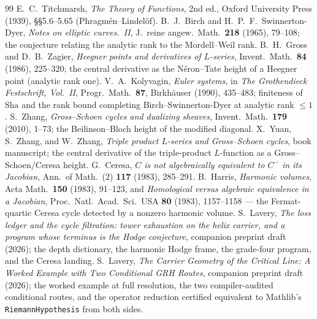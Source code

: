 \documentclass[11pt]{article}
\theoremstyle{definition}
\newcommand{\Sha}{\mathrm{Sha}}
\begin{document}
\begin{thebibliography}{99}
 E.~C.~Titchmarsh, \emph{The Theory of Functions}, 2nd ed., Oxford University
Press (1939), \S\S5.6--5.65 (Phragm\'en--Lindel\"of).
 B.~J.~Birch and H.~P.~F.~Swinnerton-Dyer, \emph{Notes on elliptic curves.\ II},
J.\ reine angew.\ Math.\ \textbf{218} (1965), 79--108; the conjecture relating the analytic rank to
the Mordell--Weil rank.
 B.~H.~Gross and D.~B.~Zagier, \emph{Heegner points and derivatives of
$L$-series}, Invent.\ Math.\ \textbf{84} (1986), 225--320; the central derivative as the
N\'eron--Tate height of a Heegner point (analytic rank one).
 V.~A.~Kolyvagin, \emph{Euler systems}, in \emph{The Grothendieck Festschrift,
Vol.\ II}, Progr.\ Math.\ \textbf{87}, Birkh\"auser (1990), 435--483; finiteness of $\Sha$ and the
rank bound completing Birch--Swinnerton-Dyer at analytic rank $\le1$.
 S.~Zhang, \emph{Gross--Schoen cycles and dualizing sheaves}, Invent.\ Math.\
\textbf{179} (2010), 1--73; the Beilinson--Bloch height of the modified diagonal.
\bibitem{YZZ} X.~Yuan, S.~Zhang, and W.~Zhang, \emph{Triple product $L$-series and Gross--Schoen
cycles}, book manuscript; the central derivative of the triple-product $L$-function as a
Gross--Schoen/Ceresa height.
 G.~Ceresa, \emph{$C$ is not algebraically equivalent to $C^-$ in its Jacobian},
Ann.\ of Math.\ (2) \textbf{117} (1983), 285--291.
 B.~Harris, \emph{Harmonic volumes}, Acta Math.\ \textbf{150} (1983), 91--123, and
\emph{Homological versus algebraic equivalence in a Jacobian}, Proc.\ Natl.\ Acad.\ Sci.\ USA
\textbf{80} (1983), 1157--1158 --- the Fermat-quartic Ceresa cycle detected by a nonzero harmonic volume.
\bibitem{HodgeCompanion} S.~Lavery, \emph{The loss ledger and the cycle filtration: tower exhaustion
on the helix carrier, and a program whose terminus is the Hodge conjecture}, companion preprint draft
(2026); the depth dictionary, the harmonic Hodge frame, the grade-four program, and the Ceresa landing.
\bibitem{GRHCompanion} S.~Lavery, \emph{The Carrier Geometry of the Critical Line: A Worked Example
with Two Conditional GRH Routes}, companion preprint draft (2026); the worked example at full
resolution, the two compiler-audited conditional routes, and the operator reduction certified
equivalent to Mathlib's \texttt{RiemannHypothesis} from both sides.


\end{thebibliography}
\end{document}
